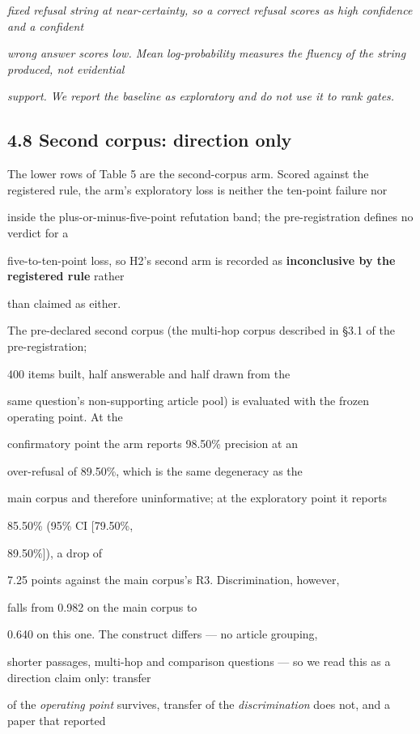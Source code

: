 \textit{fixed refusal string at near-certainty, so a correct refusal scores as high confidence and a confident}

\textit{wrong answer scores low. Mean log-probability measures the fluency of the string produced, not evidential}

\textit{support. We report the baseline as exploratory and do not use it to rank gates.}

\subsection{4.8 Second corpus: direction only}
The lower rows of Table 5 are the second-corpus arm. Scored against the registered rule, the arm's exploratory loss is neither the ten-point failure nor

inside the plus-or-minus-five-point refutation band; the pre-registration defines no verdict for a

five-to-ten-point loss, so H2's second arm is recorded as \textbf{inconclusive by the registered rule} rather

than claimed as either.

The pre-declared second corpus (the multi-hop corpus described in §3.1 of the pre-registration;

400 items built, half answerable and half drawn from the

same question's non-supporting article pool) is evaluated with the frozen operating point. At the

confirmatory point the arm reports 98.50\% precision at an

over-refusal of 89.50\%, which is the same degeneracy as the

main corpus and therefore uninformative; at the exploratory point it reports

85.50\% (95\% CI [79.50\%,

89.50\%]), a drop of

7.25 points against the main corpus's R3. Discrimination, however,

falls from 0.982 on the main corpus to

0.640 on this one. The construct differs --- no article grouping,

shorter passages, multi-hop and comparison questions --- so we read this as a direction claim only: transfer

of the \textit{operating point} survives, transfer of the \textit{discrimination} does not, and a paper that reported

